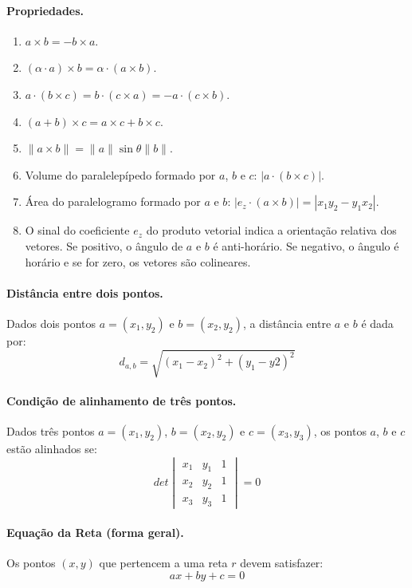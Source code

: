 \paragraph{Propriedades.} \empty

\begin{multicols}{2}
	\begin{enumerate}
		\item $a \times b = -b \times a$.
		\item $(\alpha \cdot a) \times b = \alpha \cdot (a \times b)$.
		\item $a \cdot (b \times c) = b\cdot (c \times a) = -a\cdot(c\times b)$.
		\item $(a+b)\times c = a\times c + b\times c$.
		\item $\|a \times b \| = \|a\|\sin\theta \|b\|$.
		\item Volume do paralelepípedo formado por $a$, $b$ e $c$: $|a \cdot (b \times c)|$.
		\item Área do paralelogramo formado por $a$ e $b$: $|e_z \cdot (a \times b)| = |x_1y_2-y_1x_2|$.
		\item O sinal do coeficiente $e_z$ do produto vetorial indica a orientação relativa dos vetores. Se positivo, o ângulo de $a$ e $b$ é anti-horário. Se negativo, o ângulo é horário e se for zero, os vetores são colineares.
	\end{enumerate}
\end{multicols}

	\paragraph{Distância entre dois pontos.} Dados dois pontos $a = (x_1,y_2)$ e $b = (x_2,y_2)$, a distância entre $a$ e $b$ é dada por:
		$$d_{a,b} = \sqrt{(x_1 - x_2)^2 + (y_1 - y2)^2}$$

\paragraph{Condição de alinhamento de três pontos.} Dados três pontos $a = (x_1,y_2)$, $b = (x_2,y_2)$ e $c = (x_3,y_3)$, os pontos $a$, $b$ e $c$ estão alinhados se:
		$$det
			\begin{vmatrix}
				x_1 & y_1 & 1 \\
				x_2 & y_2 & 1 \\
				x_3 & y_3 & 1
			\end{vmatrix} = 0 $$

\paragraph{Equação da Reta (forma geral).} Os pontos $(x,y)$ que pertencem a uma reta $r$ devem satisfazer:
		$$ax + by + c = 0$$

